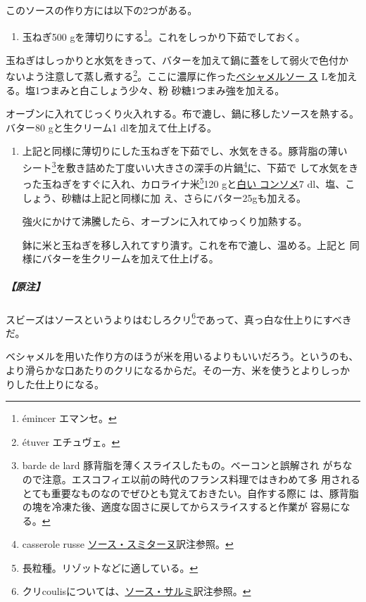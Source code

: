 \begin{recette}
このソースの作り方には以下の2つがある。

\begin{enumerate}
\def\labelenumi{\arabic{enumi}.}
\tightlist
\item
  玉ねぎ500 gを薄切りにする\footnote{émincer エマンセ。}。これをしっかり下茹でしておく。
\end{enumerate}

玉ねぎはしっかりと水気をきって、バターを加えて鍋に蓋をして弱火で色付か
ないよう注意して蒸し煮する\footnote{étuver エチュヴェ。}。ここに濃厚に作った\protect\hyperlink{sauce-bechamel}{ベシャメルソー
ス}\undemi{} Lを加える。塩1つまみと白こしょう少々、粉
砂糖1つまみ強を加える。

オーブンに入れてじっくり火入れする。布で漉し、鍋に移したソースを熱する。
バター80 gと生クリーム1 dlを加えて仕上げる。

\begin{enumerate}
\def\labelenumi{\arabic{enumi}.}
\setcounter{enumi}{1}
\item
  上記と同様に薄切りにした玉ねぎを下茹でし、水気をきる。豚背脂の薄い
  シート\footnote{barde de lard
    豚背脂を薄くスライスしたもの。ベーコンと誤解され
    がちなので注意。エスコフィエ以前の時代のフランス料理ではきわめて多
    用されるとても重要なものなのでぜひとも覚えておきたい。自作する際に
    は、豚背脂の塊を冷凍た後、適度な固さに戻してからスライスすると作業が
    容易になる。}を敷き詰めた丁度いい大きさの深手の片鍋\footnote{casserole
    russe
    \protect\hyperlink{sauce-smitane}{ソース・スミターヌ}訳注参照。}に、下茹で
  して水気をきった玉ねぎをすぐに入れ、カロライナ米\footnote{長粒種。リゾットなどに適している。}120
  gと\protect\hyperlink{consomme-blanc}{白い コンソメ}7
  dl、塩、こしょう、砂糖は上記と同様に加 え、さらにバター25gも加える。

  強火にかけて沸騰したら、オーブンに入れてゆっくり加熱する。

  鉢に米と玉ねぎを移し入れてすり潰す。これを布で漉し、温める。上記と
  同様にバターを生クリームを加えて仕上げる。
\end{enumerate}

\hypertarget{ux539fux6ce8-18}{%
\subparagraph{【原注】}\label{ux539fux6ce8-18}}

スビーズはソースというよりはむしろクリ\footnote{クリcoulisについては、\protect\hyperlink{sauce-salmis}{ソース・サルミ}訳注参照。}であって、真っ白な仕上りにすべきだ。

ベシャメルを用いた作り方のほうが米を用いるよりもいいだろう。というのも、
より滑らかな口あたりのクリになるからだ。その一方、米を使うとよりしっか
りした仕上りになる。


\end{recette}
